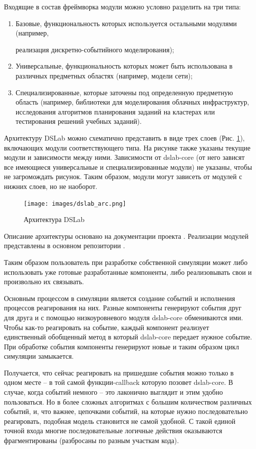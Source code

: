 Входящие в состав фреймворка модули можно условно разделить на три типа:
\begin{enumerate}
    \item 
    Базовые, функциональность которых используется остальными модулями (например, 
    
    реализация дискретно-событийного моделирования);
    \item
    Универсальные, функциональность которых может быть использована в различных предметных областях (например, модели сети);
    \item
    Специализированные, которые заточены под определенную предметную область (например, библиотеки для моделирования облачных инфраструктур, исследования алгоритмов планирования заданий на кластерах или тестирования решений учебных заданий).
\end{enumerate}

Архитектуру DSLab можно схематично представить в виде трех слоев (Рис. \ref{dslab_arc}), включающих модули соответствующего типа. На рисунке также указаны текущие модули и зависимости между ними. Зависимости от dslab-core (от него зависят все имеющиеся универсальные и специализированные модули) не указаны, чтобы не загромождать рисунок. Таким образом, модули могут зависеть от модулей с нижних слоев, но не наоборот.

\begin{figure}[H]
    \centering
    \texttt{[image: images/dslab\_arc.png]}
    \caption{Архитектура DSLab}
    \label{dslab_arc}
\end{figure}

Описание архитектуры основано на документации проекта \cite{dslab-architecture}.  Реализации модулей представлены в основном репозитории \cite{dslab-repo}.

Таким образом пользователь при разработке собственной симуляции может либо использовать уже готовые разработанные компоненты, либо реализовывать свои и произвольно их связывать. 


Основным процессом в симуляции является создание событий и исполнения процессов реагирования на них. Разные компоненты генерируют события друг для друга и с помощью низкоуровневого модуля dslab-core обмениваются ими. Чтобы как-то реагировать на событие, каждый компонент реализует единственный обобщенный метод в который dslab-core передает нужное событие. При обработке события компоненты генерируют новые и таким образом цикл симуляции замыкается. 

Получается, что сейчас реагировать на пришедшие события можно только в одном месте -- в той самой функции-callback которую позовет dslab-core. В случае, когда событий немного -- это лаконично выглядит и этим удобно пользоваться. Но в более сложных алгоритмах с большим количеством различных событий, и, что важнее, цепочками событий, на которые нужно последовательно реагировать, подобная модель становится не самой удобной. С такой единой точной входа многие последовательные логичные действия оказываются фрагментированы (разбросаны по разным участкам кода). 

